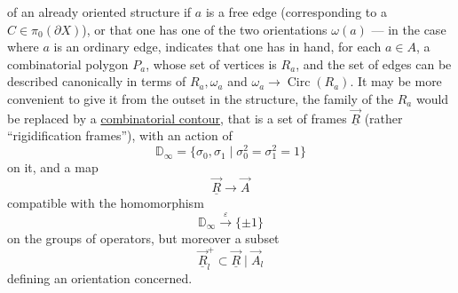 of an already oriented structure if $a$ is a free edge (corresponding to a $C\in\pi_0(\partial X)$), or that one has one of the two orientations $\omega(a)$ --- in the case where $a$ is an ordinary edge, indicates that one has in hand, for each $a\in A$, a combinatorial polygon $P_a$, whose set of vertices is $R_a$, and the set of edges can be described  canonically in terms of $R_a,\omega_a$ and $\omega_a\longrightarrow\operatorname{Circ}(R_a)$.
It may be more convenient to give it from the outset in the structure,  the family of the $R_a$ would be replaced by a
\uline{combinatorial contour}, that is a set of frames $\vec{\underline R}$ (rather ``rigidification frames''), with an action of
\[
 \mathbb D_\infty=\{\sigma_0,\sigma_1\mid\sigma_0^2=\sigma_1^2=1\}
\]
on it, and a map
\[
 \vec{\underline R}\longrightarrow\vec A
\]
compatible with the homomorphism
\[
 \mathbb D_\infty\xrightarrow{\varepsilon}\{\pm1\}
\]
on the groups of operators, but moreover a subset
\[
 \vec{\underline R}_l^+\subset\vec{\underline R}\mid\vec A_l
\]
defining an orientation  concerned.
